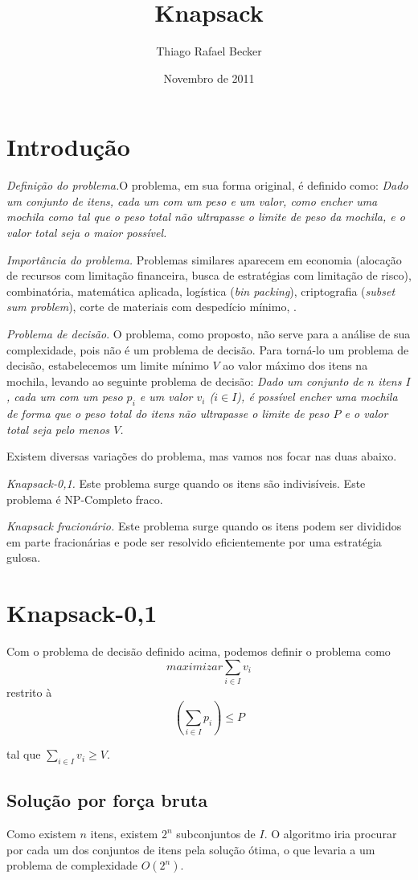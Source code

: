 \documentclass[a4paper]{article}
\title{Knapsack}
\date{Novembro de 2011}
\author{Thiago Rafael Becker}
\begin{document}
\maketitle
\section*{Introdução}
{\it Definição do problema.}O problema, em sua forma original, é definido como: {\it Dado um conjunto de itens, cada um com um peso e um valor, como encher uma mochila como tal que o 	peso total não ultrapasse o limite de peso da mochila, e o valor total seja o maior possível.}

{\it Importância do problema.} Problemas similares aparecem em economia (alocação de recursos com limitação financeira, busca de estratégias com limitação de risco), combinatória, matemática aplicada, logística ({\it bin packing}), criptografia ({\it subset sum problem}), corte de materiais com despedício mínimo, .

{\it Problema de decisão}. O problema, como proposto, não serve para a análise de sua complexidade, pois não é um problema de decisão. Para torná-lo um problema de decisão, estabelecemos um limite mínimo $V$ ao valor máximo dos itens na mochila, levando ao seguinte problema de decisão: {\it Dado um conjunto de $n$ itens $I$, cada um com um peso $p_i$ e um valor $v_i$ ($i \in I$), é possível encher uma mochila de forma que o peso total do itens não ultrapasse o limite de peso $P$ e o valor total seja pelo menos $V$.}

Existem diversas variações do problema, mas vamos nos focar nas duas abaixo.

{\it Knapsack-0,1.} Este problema surge quando os itens são indivisíveis. Este problema é NP-Completo fraco.

{\it Knapsack fracionário.} Este problema surge quando os itens podem ser divididos em parte fracionárias e pode ser resolvido eficientemente por uma estratégia gulosa.

\section*{Knapsack-0,1}
Com o problema de decisão definido acima, podemos definir o problema como
\[
maximizar \sum_{i \in I} v_i
\]
restrito à
\[
\left(\sum_{i \in I} p_i\right) \le P
\]

tal que $\displaystyle\sum_{i \in I} v_i \ge V$.

\subsection*{Solução por força bruta}
Como existem $n$ itens, existem $2^n$ subconjuntos de $I$. O algoritmo iria procurar por cada um dos conjuntos de itens pela solução ótima, o que levaria a um problema de complexidade $O(2^n)$.
\end{document}
